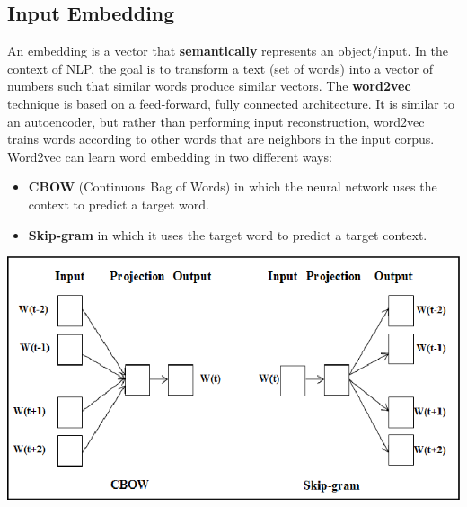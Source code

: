 \subsection{Input Embedding}
An embedding is a vector that \textbf{semantically} represents an object/input. In the context of NLP, the goal is to transform a text (set of words) into a vector of numbers such that similar words produce similar vectors. The \textbf{word2vec} technique is based on a feed-forward, fully connected architecture. It is similar to an autoencoder, but rather than performing input reconstruction, word2vec trains words according to other words that are neighbors in the input corpus.
\newline\newline
Word2vec can learn word embedding in two different ways:
\begin{itemize}
    \item \textbf{CBOW} (Continuous Bag of Words) in which the neural network uses the context to predict a target word.

    \item \textbf{Skip-gram} in which it uses the target word to predict a target context.
\end{itemize}
\begin{center}
    \includegraphics[scale = 0.4]{images/word2vec.png}
\end{center}


